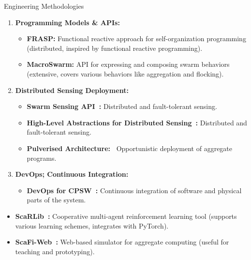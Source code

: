 \documentclass[presentation, 9pt,169]{beamer}\mode<presentation>{\usetheme{AMSBolognaFC}}
\begin{document}
\begin{frame}[fragile]{Engineering Methodologies}

  \begin{enumerate}
  \item \textbf{Programming Models \& APIs:}
  
  \begin{itemize}
  \item \textbf{FRASP:} Functional reactive approach for self-organization programming (distributed, inspired by functional reactive programming).
  \item \textbf{MacroSwarm:} API for expressing and composing swarm behaviors (extensive, covers various behaviors like aggregation and flocking).
  \end{itemize}
  
  \item \textbf{Distributed Sensing Deployment:}
  
  \begin{itemize}
  \item \textbf{Swarm Sensing API~\cite{swarm-clustering}:} Distributed and fault-tolerant sensing.
  \item \textbf{High-Level Abstractions for Distributed Sensing~\cite{aguzzi2022dynamic}:} Distributed and fault-tolerant sensing.
  \item \textbf{Pulverised Architecture:~\cite{aguzzi2021towards}} Opportunistic deployment of aggregate programs.
  \end{itemize}
  
  
  \item \textbf{DevOps; Continuous Integration:}
  
  \begin{itemize}
  \item \textbf{DevOps for CPSW~\cite{casadei2022towards}:} Continuous integration of software and physical parts of the system.
  \end{itemize}
  
  \end{enumerate}

  
  \begin{itemize}
  \item \textbf{ScaRLib~\cite{domini2023scarlib}:} Cooperative multi-agent reinforcement learning tool (supports various learning schemes, integrates with PyTorch).
  \item \textbf{ScaFi-Web~\cite{aguzzi2021scafi}:} Web-based simulator for aggregate computing (useful for teaching and prototyping).
  \end{itemize}
  
  
\end{frame}
\end{document}
